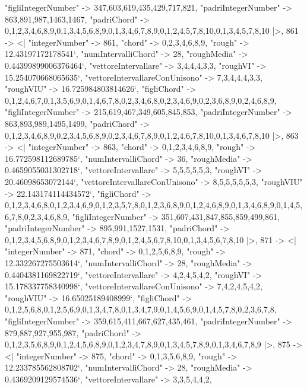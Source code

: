 \documentclass[
]{article}
\begin{document}
\begin{DatasetVerbatim}
    "figliIntegerNumber" -> {347,603,619,435,429,717,821},
    "padriIntegerNumber" -> {863,891,987,1463,1467},
    "padriChord" -> {{0,1,2,3,4,6,8,9},{0,1,3,4,5,6,8,9},{0,1,3,4,6,7,8,9},{0,1,2,4,5,7,8,10},{0,1,3,4,5,7,8,10}}
  |>,
  861 -> <|
    "integerNumber" -> 861,
    "chord" -> {0,2,3,4,6,8,9},
    "rough" -> 12.43197172178541`,
    "numIntervalliChord" -> 28,
    "roughMedia" -> 0.44399899006376464`,
    "vettoreIntervallare" -> {3,4,4,4,3,3},
    "roughVI" -> 15.254070668065635`,
    "vettoreIntervallareConUnisono" -> {7,3,4,4,4,3,3},
    "roughVIU" -> 16.725984803814626`,
    "figliChord" -> {{0,1,2,4,6,7},{0,1,3,5,6,9},{0,1,4,6,7,8},{0,2,3,4,6,8},{0,2,3,4,6,9},{0,2,3,6,8,9},{0,2,4,6,8,9}},
    "figliIntegerNumber" -> {215,619,467,349,605,845,853},
    "padriIntegerNumber" -> {863,893,989,1495,1499},
    "padriChord" -> {{0,1,2,3,4,6,8,9},{0,2,3,4,5,6,8,9},{0,2,3,4,6,7,8,9},{0,1,2,4,6,7,8,10},{0,1,3,4,6,7,8,10}}
  |>,
  863 -> <|
    "integerNumber" -> 863,
    "chord" -> {0,1,2,3,4,6,8,9},
    "rough" -> 16.772598112689785`,
    "numIntervalliChord" -> 36,
    "roughMedia" -> 0.4659055031302718`,
    "vettoreIntervallare" -> {5,5,5,5,5,3},
    "roughVI" -> 20.46098653072144`,
    "vettoreIntervallareConUnisono" -> {8,5,5,5,5,5,3},
    "roughVIU" -> 22.143174114434572`,
    "figliChord" -> {{0,1,2,3,4,6,8},{0,1,2,3,4,6,9},{0,1,2,3,5,7,8},{0,1,2,3,6,8,9},{0,1,2,4,6,8,9},{0,1,3,4,6,8,9},{0,1,4,5,6,7,8},{0,2,3,4,6,8,9}},
    "figliIntegerNumber" -> {351,607,431,847,855,859,499,861},
    "padriIntegerNumber" -> {895,991,1527,1531},
    "padriChord" -> {{0,1,2,3,4,5,6,8,9},{0,1,2,3,4,6,7,8,9},{0,1,2,4,5,6,7,8,10},{0,1,3,4,5,6,7,8,10}}
  |>,
  871 -> <|
    "integerNumber" -> 871,
    "chord" -> {0,1,2,5,6,8,9},
    "rough" -> 12.332267275503614`,
    "numIntervalliChord" -> 28,
    "roughMedia" -> 0.4404381169822719`,
    "vettoreIntervallare" -> {4,2,4,5,4,2},
    "roughVI" -> 15.178337758340998`,
    "vettoreIntervallareConUnisono" -> {7,4,2,4,5,4,2},
    "roughVIU" -> 16.65025189408999`,
    "figliChord" -> {{0,1,2,5,6,8},{0,1,2,5,6,9},{0,1,3,4,7,8},{0,1,3,4,7,9},{0,1,4,5,6,9},{0,1,4,5,7,8},{0,2,3,6,7,8}},
    "figliIntegerNumber" -> {359,615,411,667,627,435,461},
    "padriIntegerNumber" -> {879,887,927,955,987},
    "padriChord" -> {{0,1,2,3,5,6,8,9},{0,1,2,4,5,6,8,9},{0,1,2,3,4,7,8,9},{0,1,3,4,5,7,8,9},{0,1,3,4,6,7,8,9}}
  |>,
  875 -> <|
    "integerNumber" -> 875,
    "chord" -> {0,1,3,5,6,8,9},
    "rough" -> 12.233785562808702`,
    "numIntervalliChord" -> 28,
    "roughMedia" -> 0.4369209129574536`,
    "vettoreIntervallare" -> {3,3,5,4,4,2},

\end{DatasetVerbatim}
\end{document}
